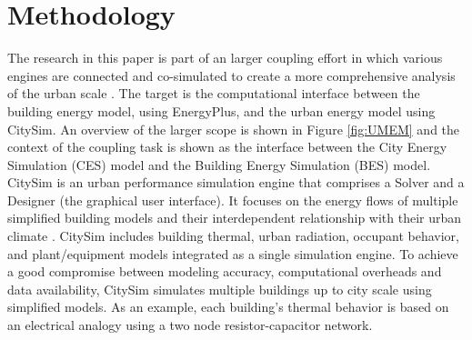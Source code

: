 \documentclass{tBPS2e}
\theoremstyle{plain}
\theoremstyle{definition}
\theoremstyle{remark}
\begin{document}

\section{Methodology}
The research in this paper is part of an larger coupling effort in which various engines are connected and co-simulated to create a more comprehensive analysis of the urban scale \citep{Dorer:2013vt}. The target is the computational
interface between the building energy model, using EnergyPlus, and the urban
energy model using CitySim. An overview of the larger scope is shown in Figure \ref{fig:UMEM} and the context of the coupling task is shown as the interface between the City Energy Simulation (CES) model and the Building Energy Simulation (BES) model. CitySim is an urban performance simulation engine that comprises a Solver and a Designer (the graphical user interface). It focuses on
the energy flows of multiple simplified building models and their
interdependent relationship with their urban climate \citep{Robinson:2009tm}.
CitySim includes building thermal, urban radiation, occupant behavior, and
plant/equipment models integrated as a single simulation engine. To achieve a
good compromise between modeling accuracy, computational overheads and data
availability, CitySim simulates multiple buildings up to city scale using
simplified models. As an example, each building's thermal behavior is based on
an electrical analogy using a two node resistor-capacitor network. 
\end{document}
